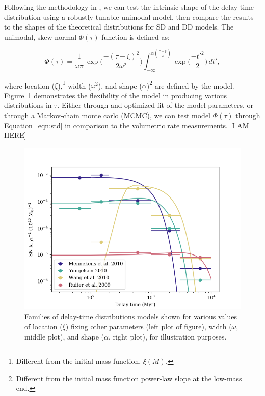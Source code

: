 \documentclass[apj]{aastex62}
\begin{document}
Following the methodology in \cite{Strolger:2010}, we can test the intrinsic shape of the delay time distribution using a robustly tunable unimodal model, then compare the results to the shapes of the theoretical distributions for SD and DD models. The unimodal, skew-normal $\Phi(\tau)$ function is defined as:

\begin{equation}
	\Phi(\tau)=\frac{1}{\omega\pi}\,\exp\biggl(\frac{-(\tau-\xi)^2}{2\omega^2}\biggr)\int_{-\infty}^{\alpha (\frac{\tau-\xi}{\omega})} \exp\biggl(\frac{-t'^2}{2}\biggr)\,dt',
\label{eqn:model}
\end{equation}

\noindent where location ($\xi$),\footnote{Different from the initial mass function, $\xi(M)$.} width ($\omega^2$), and shape ($\alpha$)\footnote{Different from the initial mass function power-law slope at the low-mass end.} are defined by the model. Figure~\ref{fig:dtd_families} demonstrates the flexibility of the model in producing various distributions in $\tau$. Either through and optimized fit of the model parameters, or through a Markov-chain monte carlo (MCMC), we can test model $\Phi(\tau)$ through Equation~\ref{eqn:std} in comparison to the volumetric rate measurements.
[I AM HERE]

\begin{figure}[t]
   \centering
   \includegraphics[width=6.5in]{figure_sd_fits}
   \caption{\footnotesize Families of delay-time distributions models shown for various values of location ($\xi$) fixing other parameters (left plot of figure), width ($\omega$, middle plot), and shape ($\alpha$, right plot), for illustration purposes.}
   \label{fig:dtd_families}
\end{figure}
\end{document}
